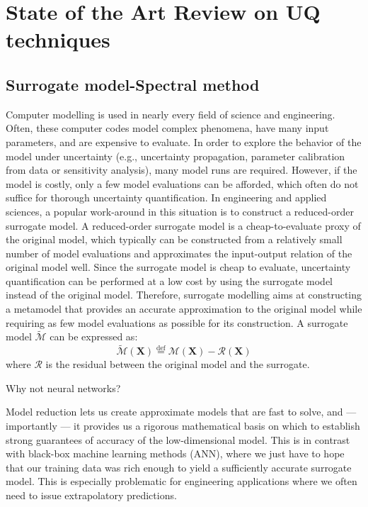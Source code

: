 \chapter{State of the Art Review on UQ techniques}

\label{ch:State}

\section{Surrogate model-Spectral method}

Computer modelling is used in nearly every field of science and engineering. Often, these computer codes model complex phenomena, have many input parameters,
and are expensive to evaluate. In order to explore the behavior of the model under uncertainty (e.g., uncertainty propagation, parameter calibration from data or sensitivity analysis), many
model runs are required. However, if the model is costly, only a few model evaluations can be afforded, which often do not suffice for thorough uncertainty quantification. In engineering and applied sciences, a popular work-around in this situation is to construct a reduced-order surrogate model. A reduced-order surrogate model is a cheap-to-evaluate proxy of the original model, which typically can be constructed from a relatively small number of model evaluations and approximates
the input-output relation of the original model well. Since the surrogate model is cheap to evaluate, uncertainty quantification can be performed at a low cost by using the surrogate
model instead of the original model. Therefore, surrogate modelling aims at constructing a metamodel that provides an accurate approximation to the original model while requiring as few model evaluations as possible for its construction. A surrogate model $\tilde{\mathcal{M}}$ can be expressed as:
\begin{equation}
    \tilde{\mathcal{M}}(\boldsymbol{X})  \overset{\mathrm{def}}{=} \mathcal{M}(\boldsymbol{X}) - \mathcal{R}(\boldsymbol{X})
\end{equation}
where $\mathcal{R}$ is the residual between the original model and the surrogate.

Why not neural networks?

Model reduction lets us create approximate models that are fast to solve, and — importantly — it provides us a rigorous mathematical basis on which to establish strong guarantees of accuracy of the low-dimensional model. This is in contrast with black-box machine learning methods (ANN), where we just have to hope that our training data was rich enough to yield a sufficiently accurate surrogate model. This is especially problematic for engineering applications where we often need to issue extrapolatory predictions.

